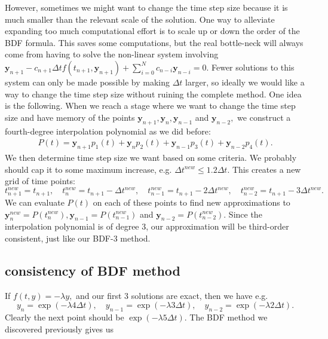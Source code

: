 \documentclass[10pt,a4paper]{article}
\newcommand{\bvec}[1]{\mathbf{#1}}
\begin{document}
However, sometimes we might want to change the time step size because it is much smaller than the relevant scale of the solution. One way to alleviate expanding too much computational effort is to scale up or down the order of the BDF formula. This saves some computations, but the real bottle-neck will always come from having to solve the non-linear system involving $\bvec{y}_{n+1} - c_{n+1}\Delta t f(t_{n+1}, \bvec{y}_{n+1}) + \sum_{i=0}^{N}c_{n-i} \bvec{y}_{n-i}=0.$
Fewer solutions to this system can only be made possible by making $\Delta t$ larger, so ideally we would like a way to change the time step size without ruining the complete method.
One idea is the following. When we reach a stage where we want to change the time step size and have memory of the points $\bvec{y}_{n+1},\bvec{y}_n,\bvec{y}_{n-1}$ and $\bvec{y}_{n-2},$ we construct a fourth-degree interpolation polynomial as we did before:
\begin{align*}
  P(t) = \bvec{y}_{n+1}p_1(t) + \bvec{y}_{n}p_2(t) + \bvec{y}_{n-1}p_3(t) + \bvec{y}_{n-2}p_4(t).
\end{align*}
We then determine time step size we want based on some criteria. We probably should cap it to some maximum increase, e.g. $\Delta t^{new} \leq 1.2 \Delta t$. This creates a new grid of time points:
\begin{equation*}
  t_{n+1}^{new} = t_{n+1}, \quad t_n^{new} = t_{n+1}-\Delta t^{new}, \quad t_{n-1}^{new} = t_{n+1}- 2\Delta t^{new},\quad t_{n-2}^{new} = t_{n+1}- 3\Delta t^{new}.
\end{equation*}
We can evaluate $P(t)$ on each of these points to find new approximations to $\bvec{y}_n^{new}=P(t_n^{new}), \bvec{y}_{n-1}=P(t_{n-1}^{new})$ and $\bvec{y}_{n-2}=P(t_{n-2}^{new}).$
Since the interpolation polynomial is of degree 3, our approximation will be third-order consistent, just like our BDF-3 method.

\subsection{consistency of BDF method}
If $f(t, y) = -\lambda y,$ and our first 3 solutions are exact, then we have e.g.
\begin{equation*}
  y_{n} = \exp(-\lambda 4 \Delta t), \quad   y_{n-1} = \exp(-\lambda 3 \Delta t), \quad   y_{n-2} = \exp(-\lambda 2 \Delta t).
\end{equation*}
Clearly the next point should be $\exp(-\lambda 5 \Delta t).$ The BDF method we discovered previously gives us
\end{document}
